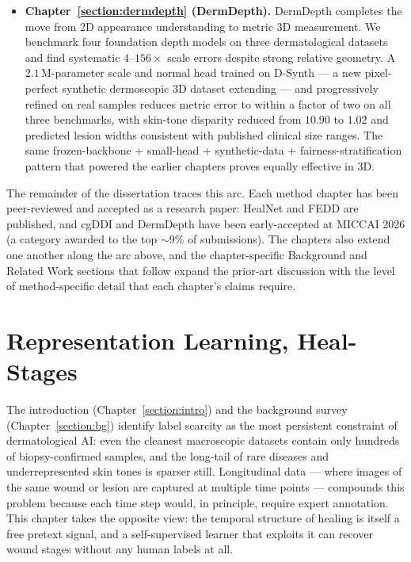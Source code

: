\documentclass[11pt]{ucthesis}
\begin{document}
\begin{itemize}
    \item \textbf{Chapter~\ref{section:dermdepth} (DermDepth).} DermDepth completes the move from 2D appearance understanding to metric 3D measurement. We benchmark four foundation depth models \cite{wang2025moge2,depthanything3,keetha2026mapanything,xu2025pixel} on three dermatological datasets and find systematic $4$--$156\times$ scale errors despite strong relative geometry. A $2.1$\,M-parameter scale and normal head trained on D-Synth --- a new pixel-perfect synthetic dermoscopic 3D dataset extending \cite{kim-2024} --- and progressively refined on real samples reduces metric error to within a factor of two on all three benchmarks, with skin-tone disparity reduced from $10.90$ to $1.02$ and predicted lesion widths consistent with published clinical size ranges. The same frozen-backbone + small-head + synthetic-data + fairness-stratification pattern that powered the earlier chapters proves equally effective in 3D.
\end{itemize}

The remainder of the dissertation traces this arc. Each method chapter has been peer-reviewed and accepted as a research paper: HealNet \cite{Carrin2022HealNet} and FEDD \cite{Carrion2023FEDDF} are published, and cgDDI and DermDepth have been early-accepted at MICCAI 2026 (a category awarded to the top $\sim$9\% of submissions). The chapters also extend one another along the arc above, and the chapter-specific Background and Related Work sections that follow expand the prior-art discussion with the level of method-specific detail that each chapter's claims require.
\chapter{Representation Learning, Heal-Stages}\label{section:healnet}

The introduction (Chapter~\ref{section:intro}) and the background survey (Chapter~\ref{section:bg}) identify label scarcity as the most persistent constraint of dermatological AI: even the cleanest macroscopic datasets contain only hundreds of biopsy-confirmed samples, and the long-tail of rare diseases and underrepresented skin tones is sparser still. Longitudinal data --- where images of the same wound or lesion are captured at multiple time points --- compounds this problem because each time step would, in principle, require expert annotation. This chapter takes the opposite view: the temporal structure of healing is itself a free pretext signal, and a self-supervised learner that exploits it can recover wound stages without any human labels at all.
\end{document}
